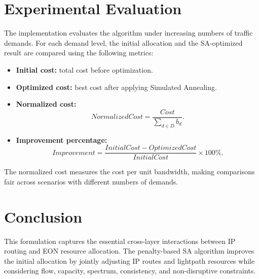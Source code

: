 \documentclass[journal,10pt]{IEEEtran}
\begin{document}
\section{Experimental Evaluation}

The implementation evaluates the algorithm under increasing numbers of traffic demands. For each demand level, the initial allocation and the SA-optimized result are compared using the following metrics:
\begin{itemize}
    \item \textbf{Initial cost:} total cost before optimization.
    \item \textbf{Optimized cost:} best cost after applying Simulated Annealing.
    \item \textbf{Normalized cost:}
    \begin{equation}
        NormalizedCost = \frac{Cost}{\sum_{d\in D} b_d}.
    \end{equation}
    \item \textbf{Improvement percentage:}
    \begin{equation}
        Improvement =
        \frac{InitialCost - OptimizedCost}{InitialCost}\times 100\%.
    \end{equation}
\end{itemize}

The normalized cost measures the cost per unit bandwidth, making comparisons fair across scenarios with different numbers of demands.

\section{Conclusion}

This formulation captures the essential cross-layer interactions between IP routing and EON resource allocation. The penalty-based SA algorithm improves the initial allocation by jointly adjusting IP routes and lightpath resources while considering flow, capacity, spectrum, consistency, and non-disruptive constraints.

\balance
\end{document}
